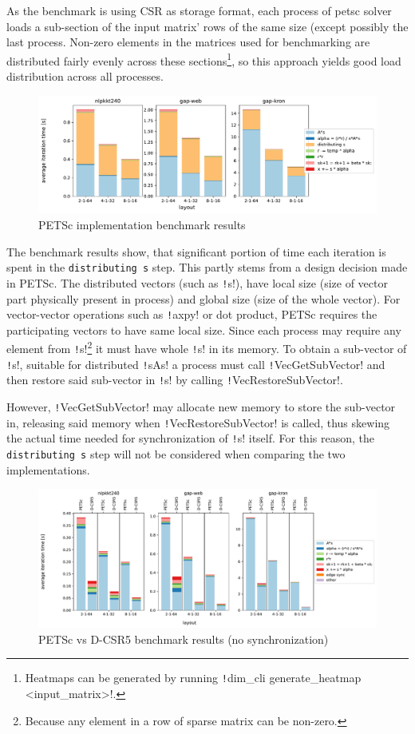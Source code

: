 \documentclass[thesis=M,english]{FITthesis}[2019/12/23]
\newcommand{\csre}[1]{\texttt!#1!}
\begin{document}
As the benchmark is using CSR as storage format,
each process of petsc solver loads a sub-section of the input matrix' rows of the same size (except possibly the last
process. Non-zero elements in the matrices used for benchmarking are distributed fairly
evenly across these sections\footnote{Heatmaps can be generated by running  \csre{dim_cli generate_heatmap <input_matrix>}.},
so this approach yields good load distribution across all processes.

\begin{figure}[htp]
    \centering
    \includegraphics[scale=0.45]{static/petsc_mpi.pdf}
    \caption{PETSc implementation benchmark results}
\end{figure}

The benchmark results show, that significant portion of time each iteration is spent in the \texttt{distributing s}
step. This partly stems from a design decision made in PETSc. The distributed vectors (such as \csre{s}),
have local size (size of vector part physically present in process) and global size (size of the whole vector).
For vector-vector operations such as \csre{axpy} or dot product, PETSc requires the participating vectors to
have same local size. Since each process may require any element from
\csre{s}\footnote{Because any element in a row of sparse matrix can be non-zero.} it must have whole \csre{s}
in its memory. To obtain a sub-vector of \csre{s}, suitable for distributed \csre{sAs} a process must call
\csre{VecGetSubVector} and then restore said sub-vector in \csre{s} by calling \csre{VecRestoreSubVector}.

However, \csre{VecGetSubVector} may allocate new memory to store the sub-vector in, releasing said memory
when \csre{VecRestoreSubVector} is called, thus skewing the actual time needed for synchronization of
\csre{s} itself. For this reason, the \texttt{distributing s} step will not be considered when comparing
the two implementations.

\begin{figure}[htp]
    \centering
    \includegraphics[scale=0.4]{static/petsc_vs_dim.pdf}
    \caption{PETSc vs D-CSR5 benchmark results (no synchronization)}\label{bench:petsc:vsDim}
\end{figure}
\end{document}
